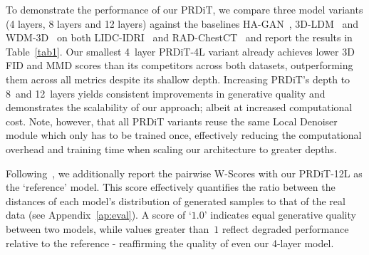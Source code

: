 

To demonstrate the performance of our PRDiT, we compare three model variants (4 layers, 8 layers and 12 layers) against the baselines HA\mbox{-}GAN~\citep{sun2022hierarchical}, 3D\mbox{-}LDM~\citep{khader2023medical} and WDM\mbox{-}3D~\citep{friedrich2024wdm} on both LIDC\mbox{-}IDRI~\citep{armato2011lung} and RAD-ChestCT~\citep{draelos2020rad} and report the results in Table~\ref{tab1}. Our smallest 4~layer PRDiT-4L variant already achieves lower 3D FID and MMD scores than its competitors across both datasets, outperforming them across all metrics despite its shallow depth. Increasing PRDiT's depth to 8~and 12~layers yields consistent improvements in generative quality and demonstrates the scalability of our approach; albeit at increased computational cost. Note, however, that all PRDiT variants reuse the same Local Denoiser module which only has to be trained once, effectively reducing the computational overhead and training time when scaling our architecture to greater depths. 

Following~\citet{zhang2023improving}, we additionally report the pairwise W\mbox{-}Scores with our PRDiT-12L as the `reference' model. This score effectively quantifies the ratio between the distances of each model's distribution of generated samples to that of the real data (see Appendix~\ref{ap:eval}). A score of `$1.0$' indicates equal generative quality between two models, while values greater than~$1$ reflect degraded performance relative to the reference - reaffirming the quality of even our 4-layer model.

